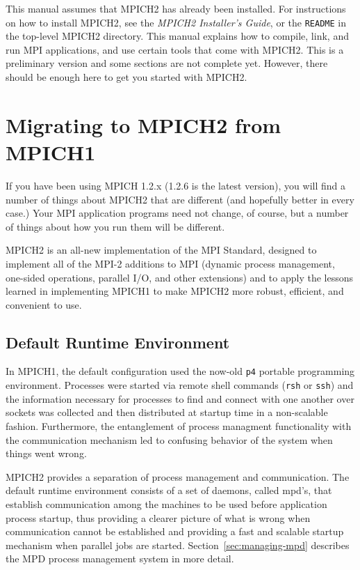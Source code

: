\documentclass[dvipdfm,11pt]{article}
\begin{document}
This manual assumes that MPICH2 has already been installed.  For
instructions on how to install MPICH2, see the \emph{MPICH2 Installer's Guide},
or the \texttt{README} in the top-level MPICH2 directory.  This manual
explains how to compile, link, and run MPI applications, and use certain
tools that come with MPICH2.  This is a preliminary version and some
sections are not complete yet.  However, there should be enough here to
get you started with MPICH2.


\section{Migrating to MPICH2 from MPICH1}
\label{sec:migrating}

If you have been using MPICH 1.2.x (1.2.6 is the latest version), you
will find a number of things about MPICH2 that are different (and
hopefully better in every case.)  Your MPI application programs need not
change, of course, but a number of things about how you run them will be
different.

MPICH2 is an all-new implementation of the MPI Standard, designed to
implement all of the MPI-2 additions to MPI (dynamic process management,
one-sided operations, parallel I/O, and other extensions) and to apply
the lessons learned in implementing MPICH1 to make MPICH2 more robust,
efficient, and convenient to use.


\subsection{Default Runtime Environment}
\label{sec:default-environment}

In MPICH1, the default configuration used the now-old \texttt{p4}
portable programming environment.  Processes were started via remote
shell commands (\texttt{rsh} or \texttt{ssh}) and the information
necessary for processes to find and connect with one another over
sockets was collected and then distributed at startup time in a
non-scalable fashion.  Furthermore, the entanglement of process
managment functionality with the communication mechanism led to
confusing behavior of the system when things went wrong.

MPICH2 provides a separation of process management and communication.
The default runtime environment consists of a set of daemons, called
mpd's, that establish communication among the machines to be used before
application process startup, thus providing a clearer picture of what is
wrong when communication cannot be established and providing a fast and
scalable startup mechanism when parallel jobs are
started. Section~\ref{sec:managing-mpd} describes the MPD process
management system in more detail.
\end{document}
